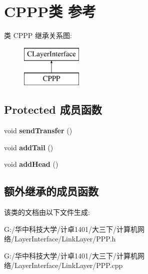 \hypertarget{class_c_p_p_p}{}\section{C\+P\+P\+P类 参考}
\label{class_c_p_p_p}
类 C\+P\+PP 继承关系图\+:\begin{figure}[H]
\begin{center}
\leavevmode
\includegraphics[height=2.000000cm]{class_c_p_p_p}
\end{center}
\end{figure}
\subsection*{Protected 成员函数}
\begin{DoxyCompactItemize}
\item 
\mbox{\label{class_c_p_p_p_a1d8be0d39e44ad6e6971329106e5900d}} 
void {\bfseries send\+Transfer} ()
\item 
\mbox{\label{class_c_p_p_p_a2b345908338ada3b4d9e58d14270725a}} 
void {\bfseries add\+Tail} ()
\item 
\mbox{\label{class_c_p_p_p_aba6a014532e6d329cf1f8dfb591eff72}} 
void {\bfseries add\+Head} ()
\end{DoxyCompactItemize}
\subsection*{额外继承的成员函数}


该类的文档由以下文件生成\+:\begin{DoxyCompactItemize}
\item 
G\+:/华中科技大学/计卓1401/大三下/计算机网络/\+Layer\+Interface/\+Link\+Layer/P\+P\+P.\+h\item 
G\+:/华中科技大学/计卓1401/大三下/计算机网络/\+Layer\+Interface/\+Link\+Layer/P\+P\+P.\+cpp\end{DoxyCompactItemize}
